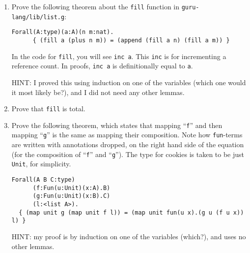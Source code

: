 \documentclass{book}[12pt]
\begin{document}
\begin{enumerate}
\item Prove the following theorem about the \texttt{fill} function in \texttt{guru-lang/lib/list.g}:

\begin{verbatim}
Forall(A:type)(a:A)(n m:nat).
      { (fill a (plus n m)) = (append (fill a n) (fill a m)) }
\end{verbatim}

\noindent In the code for \texttt{fill}, you will see \texttt{inc a}.
This \texttt{inc} is for incrementing a reference count.  In proofs,
\texttt{inc a} is definitionally equal to \texttt{a}.

\noindent HINT: I proved this using induction on one of the variables
(which one would it most likely be?), and I did not need any other
lemmas.

\item Prove that \texttt{fill} is total.

\item Prove the following theorem, which states that mapping
``\texttt{f}'' and then mapping ``\texttt{g}'' is the same as mapping
their composition.  Note how \texttt{fun}-terms are written with
annotations dropped, on the right hand side of the equation (for the
composition of ``\texttt{f}'' and ``\texttt{g}'').  The type for cookies
is taken to be just \texttt{Unit}, for simplicity.

\begin{verbatim}
Forall(A B C:type)
      (f:Fun(u:Unit)(x:A).B)
      (g:Fun(u:Unit)(x:B).C)
      (l:<list A>).
  { (map unit g (map unit f l)) = (map unit fun(u x).(g u (f u x)) l) } 
\end{verbatim}

\noindent HINT: my proof is by induction on one of the variables (which?), and
uses no other lemmas.

\end{enumerate}

 
\end{document}
